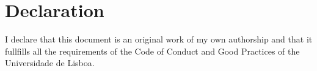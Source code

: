 
\section*{Declaration}

I declare that this document is an original work of my own authorship and that
it fullfills all the requirements of the Code of Conduct and Good Practices of
the Universidade de Lisboa.
